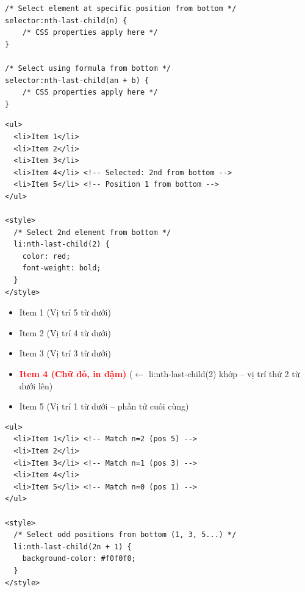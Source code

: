 \documentclass[11pt,oneside]{book}
\begin{document}
\begin{codeWindow}
\begin{lstlisting}[language=CSS3]
/* Select element at specific position from bottom */
selector:nth-last-child(n) {
    /* CSS properties apply here */
}

/* Select using formula from bottom */
selector:nth-last-child(an + b) {
    /* CSS properties apply here */
}
\end{lstlisting}
\end{codeWindow}

\begin{codeWindow}
\begin{lstlisting}[language=HTML5]
<ul>
  <li>Item 1</li>
  <li>Item 2</li>
  <li>Item 3</li>
  <li>Item 4</li> <!-- Selected: 2nd from bottom -->
  <li>Item 5</li> <!-- Position 1 from bottom -->
</ul>

<style>
  /* Select 2nd element from bottom */
  li:nth-last-child(2) {
    color: red;
    font-weight: bold;
  }
</style>
\end{lstlisting}
\end{codeWindow}

\begin{browserWindow}
\sffamily\small
\begin{itemize}[leftmargin=1.5em, itemsep=2pt, parsep=0pt]
    \item Item 1 {\scriptsize\textcolor{gray!60}{(Vị trí 5 từ dưới)}}
    \item Item 2 {\scriptsize\textcolor{gray!60}{(Vị trí 4 từ dưới)}}
    \item Item 3 {\scriptsize\textcolor{gray!60}{(Vị trí 3 từ dưới)}}
    \item \textcolor{red}{\textbf{Item 4 (Chữ đỏ, in đậm)}} {\scriptsize\textcolor{gray!60}{($\leftarrow$ li:nth-last-child(2) khớp -- vị trí thứ 2 từ dưới lên)}}
    \item Item 5 {\scriptsize\textcolor{gray!60}{(Vị trí 1 từ dưới -- phần tử cuối cùng)}}
\end{itemize}
\end{browserWindow}

\begin{codeWindow}
\begin{lstlisting}[language=HTML5]
<ul>
  <li>Item 1</li> <!-- Match n=2 (pos 5) -->
  <li>Item 2</li>
  <li>Item 3</li> <!-- Match n=1 (pos 3) -->
  <li>Item 4</li>
  <li>Item 5</li> <!-- Match n=0 (pos 1) -->
</ul>

<style>
  /* Select odd positions from bottom (1, 3, 5...) */
  li:nth-last-child(2n + 1) {
    background-color: #f0f0f0;
  }
</style>
\end{lstlisting}
\end{codeWindow}
\end{document}
